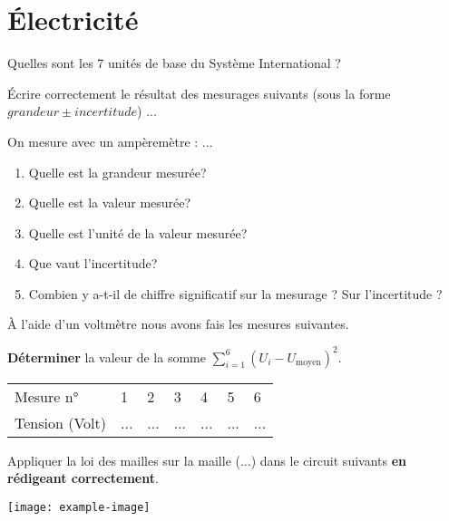 \documentclass[11pt]{exam}		%
\title{\Titre}
\newcommand{\Titre}{Électricité} %
\begin{document}
\thispagestyle{headandfoot}

\section{\Titre} %

\headrule
\footrule
\setlength{\columnsep}{0.25cm}
\setlength{\columnseprule}{1pt}

\consignes



\begin{questions}
	\question[1] Quelles sont les 7 unités de base du Système International ?

	\question[1\half] Écrire correctement le résultat des mesurages suivants (sous la forme $grandeur \pm incertitude$)
	...

	\question[2\half]
	On mesure avec un ampèremètre :  ...
	\begin{multicols}{2}
		\begin{enumerate}[label=\alph*)]
			\item Quelle est la grandeur mesurée?
			\item Quelle est la valeur mesurée?
			\item Quelle est l'unité de la valeur mesurée?
			\item Que vaut l'incertitude?
			\item Combien y a-t-il de chiffre significatif sur la mesurage ? Sur l'incertitude ?
		\end{enumerate}
	\end{multicols}

	\begin{minipage}[c]{0.6\textwidth}
		\question[3] À l'aide d'un voltmètre nous avons fais les mesures suivantes.

		\textbf{Déterminer} la valeur de la somme $\sum_{i=1}^6 ({U_i} - {U_\text{moyen}})^2$.
		\begin{center}
			\begin{tabular}{@{}|l|llllll|@{}} \toprule
				Mesure n°      & 1   & 2   & 3   & 4   & 5   & 6   \\
				Tension (Volt) & ... & ... & ... & ... & ... & ... \\\bottomrule
			\end{tabular}
		\end{center}

		\question[2] Appliquer la loi des mailles sur la maille (...) dans le circuit suivants \textbf{en rédigeant correctement}.

	\end{minipage}
	\hspace{0.05\textwidth}
	\begin{minipage}[c]{0.2\textwidth}
		\texttt{[image:  example-image]}
	\end{minipage}
\end{questions}

\countpoint
\end{document}
